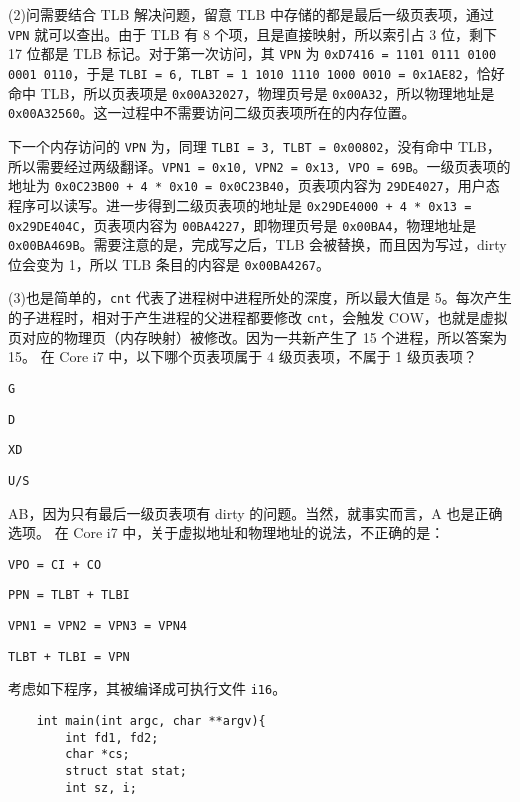 \begin{problems}
        (2)问需要结合 TLB 解决问题，留意 TLB 中存储的都是最后一级页表项，通过 \verb|VPN| 就可以查出。由于 TLB 有 8 个项，且是直接映射，所以索引占 3 位，剩下 17 位都是 TLB 标记。对于第一次访问，其 \verb|VPN| 为 \verb|0xD7416 = 1101 0111 0100 0001 0110|，于是 \verb|TLBI = 6, TLBT = 1 1010 1110 1000 0010 = 0x1AE82|，恰好命中 TLB，所以页表项是 \verb|0x00A32027|，物理页号是 \verb|0x00A32|，所以物理地址是 \verb|0x00A32560|。这一过程中不需要访问二级页表项所在的内存位置。
        
        下一个内存访问的 \verb|VPN| 为，同理 \verb|TLBI = 3, TLBT = 0x00802|，没有命中 TLB，所以需要经过两级翻译。\verb|VPN1 = 0x10, VPN2 = 0x13, VPO = 69B|。一级页表项的地址为 \verb|0x0C23B00 + 4 * 0x10 = 0x0C23B40|，页表项内容为 \verb|29DE4027|，用户态程序可以读写。进一步得到二级页表项的地址是 \verb|0x29DE4000 + 4 * 0x13 = 0x29DE404C|，页表项内容为 \verb|00BA4227|，即物理页号是 \verb|0x00BA4|，物理地址是 \verb|0x00BA469B|。需要注意的是，完成写之后，TLB 会被替换，而且因为写过，dirty 位会变为 1，所以 TLB 条目的内容是 \verb|0x00BA4267|。

        (3)也是简单的，\verb|cnt| 代表了进程树中进程所处的深度，所以最大值是 5。每次产生的子进程时，相对于产生进程的父进程都要修改 \verb|cnt|，会触发 COW，也就是虚拟页对应的物理页（内存映射）被修改。因为一共新产生了 15 个进程，所以答案为 15。
         在 Core i7 中，以下哪个页表项属于 4 级页表项，不属于 1 级页表项？
        \begin{choices}
            \item \verb|G|
            \item \verb|D|
            \item \verb|XD|
            \item \verb|U/S|
        \end{choices}
        \sol AB，因为只有最后一级页表项有 dirty 的问题。当然，就事实而言，A 也是正确选项。
         在 Core i7 中，关于虚拟地址和物理地址的说法，不正确的是：
        \begin{choices}
            \item \verb|VPO = CI + CO|
            \item \verb|PPN = TLBT + TLBI|
            \item \verb|VPN1 = VPN2 = VPN3 = VPN4|
            \item \verb|TLBT + TLBI = VPN|
        \end{choices}
         考虑如下程序，其被编译成可执行文件 \verb|i16|。
        \begin{verbatim}
    int main(int argc, char **argv){
        int fd1, fd2;
        char *cs;
        struct stat stat;
        int sz, i;


\end{verbatim}
\end{problems}
